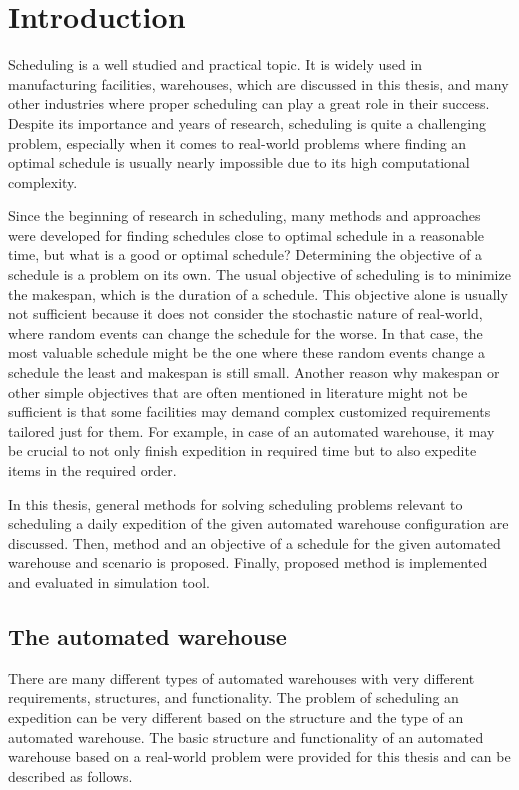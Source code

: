 \documentclass{ctuthesis}
\begin{document}
\maketitle

\chapter{Introduction}

Scheduling is a well studied and practical topic. It is widely used in manufacturing facilities, warehouses, which are discussed in this thesis, and many other industries where proper scheduling can play a great role in their success. Despite its importance and years of research, scheduling is quite a challenging problem, especially when it comes to real-world problems where finding an optimal schedule is usually nearly impossible due to its high computational complexity. 

Since the beginning of research in scheduling, many methods and approaches were developed for finding schedules close to optimal schedule in a reasonable time, but what is a good or optimal schedule? Determining the objective of a schedule is a problem on its own. The usual objective of scheduling is to minimize the makespan, which is the duration of a schedule. This objective alone is usually not sufficient because it does not consider the stochastic nature of real-world, where random events can change the schedule for the worse. In that case, the most valuable schedule might be the one where these random events change a schedule the least and makespan is still small. Another reason why makespan or other simple objectives that are often mentioned in literature might not be sufficient is that some facilities may demand complex customized requirements tailored just for them. For example, in case of an automated warehouse, it may be crucial to not only finish expedition in required time but to also expedite items in the required order. 

In this thesis, general methods for solving scheduling problems relevant to scheduling a daily expedition of the given automated warehouse configuration are discussed. Then, method and an objective of a schedule for the given automated warehouse and scenario is proposed. Finally, proposed method is implemented and evaluated in simulation tool. 

\section{The automated warehouse}
\label{sec:wh}
There are many different types of automated warehouses with very different requirements, structures, and functionality. The problem of scheduling an expedition can be very different based on the structure and the type of an automated warehouse. The basic structure and functionality of an automated warehouse based on a real-world problem were provided for this thesis and can be described as follows.
\end{document}
